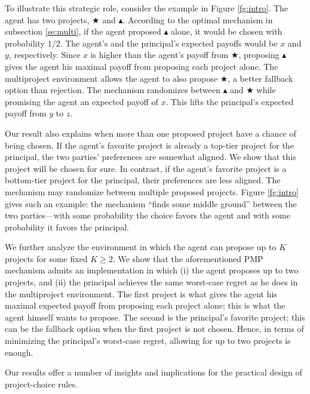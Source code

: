 \documentclass[12pt,english]{article}
\theoremstyle{remark}
\theoremstyle{plain}
\theoremstyle{definition}
\begin{document}
To illustrate this strategic role, consider the example in Figure \ref{fg:intro}. The agent has two projects, $\bigstar$ and $\blacktriangle$. According to the optimal mechanism in subsection \ref{se:multi}, if the agent proposed $\blacktriangle$ alone, it would be chosen with probability $1/2$. The agent's and the principal's expected payoffs would be $x$ and $y$, respectively. Since $x$ is higher than the agent's payoff from $\bigstar$, proposing $\blacktriangle$ gives the agent his maximal payoff from proposing each project alone. The multiproject environment allows the agent to also propose $\bigstar$, a better fallback option than rejection. The mechanism randomizes between $\blacktriangle$ and $\bigstar$ while promising the agent an expected payoff of $x$. This lifts the principal's expected payoff from $y$ to $z$.

Our result also explains when more than one proposed project have a chance of being chosen. If the agent's favorite project is already a top-tier project for the principal, the two parties' preferences are somewhat aligned. We show that this project will be chosen for sure. In contrast, if the agent's favorite project is a bottom-tier project for the principal, their preferences are less aligned. The mechanism may randomize between multiple proposed projects. Figure \ref{fg:intro} gives such an example: the mechanism ``finds some middle ground'' between the two parties---with some probability the choice favors the agent and with some probability it favors the principal.


We further analyze the environment in which the agent can propose up to $K$ projects for some fixed $K \geqslant 2$. We show that the aforementioned PMP mechanism admits an implementation in which (i) the agent proposes up to two projects, and (ii) the principal achieves the same worst-case regret as he does in the multiproject environment. The first project is what gives the agent his maximal expected payoff from proposing each project alone; this is what the agent himself wants to propose. The second is the principal's favorite project; this can be the fallback option when the first project is not chosen. Hence, in terms of minimizing the principal's worst-case regret, allowing for up to two projects is enough. 

Our results offer a number of insights and implications for the practical design of project-choice rules. 
\end{document}
